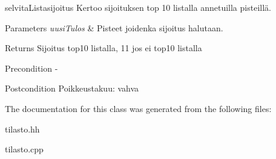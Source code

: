 selvita\-Listasijoitus Kertoo sijoituksen top 10 listalla annetuilla pisteillä. 


\begin{DoxyParams}{Parameters}
{\em uusi\-Tulos} & Pisteet joidenka sijoitus halutaan. \\
\hline
\end{DoxyParams}
\begin{DoxyReturn}{Returns}
Sijoitus top10 listalla, 11 jos ei top10 listalla 
\end{DoxyReturn}
\begin{DoxyPrecond}{Precondition}
-\/ 
\end{DoxyPrecond}
\begin{DoxyPostcond}{Postcondition}
Poikkeustakuu\-: vahva 
\end{DoxyPostcond}


The documentation for this class was generated from the following files\-:\begin{DoxyCompactItemize}
\item 
tilasto.\-hh\item 
tilasto.\-cpp\end{DoxyCompactItemize}
